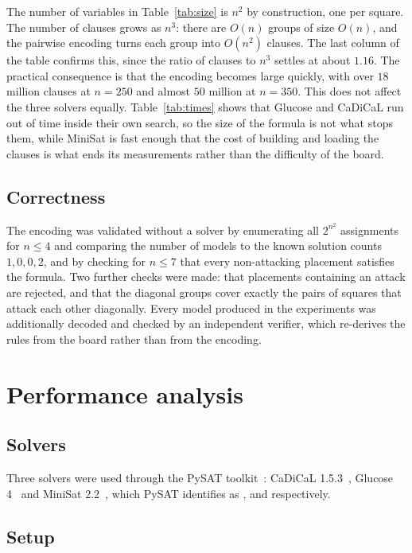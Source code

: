 \documentclass[11pt,a4paper]{article}
\begin{document}
The number of variables in Table~\ref{tab:size} is $n^2$ by construction,
one per square. The number of clauses grows as $n^3$: there are $O(n)$
groups of size $O(n)$, and the pairwise encoding turns each group into
$O(n^2)$ clauses. The last column of the table confirms this, since the
ratio of clauses to $n^3$ settles at about $1.16$.
The practical consequence is that the encoding becomes large quickly, with over
$18$ million clauses at $n=250$ and almost $50$ million at $n=350$. This does
not affect the three solvers equally. Table~\ref{tab:times} shows that
Glucose and CaDiCaL run out of time inside their own search, so the size of
the formula is not what stops them, while MiniSat is fast enough that the
cost of building and loading the clauses is what ends its measurements
rather than the difficulty of the board.

\subsection*{Correctness}

The encoding was validated without a solver by enumerating all $2^{n^2}$
assignments for $n \le 4$ and comparing the number of models to the known
solution counts $1, 0, 0, 2$, and by checking for $n \le 7$ that every
non-attacking placement satisfies the formula. Two further checks were made:
that placements containing an attack are rejected, and that the diagonal
groups cover exactly the pairs of squares that attack each other
diagonally. Every model produced in the experiments was additionally decoded
and checked by an independent verifier, which re-derives the rules from the
board rather than from the encoding.

\section{Performance analysis}

\subsection*{Solvers}

Three solvers were used through the PySAT toolkit~\cite{pysat}: CaDiCaL
1.5.3~\cite{cadical}, Glucose 4~\cite{glucose} and MiniSat
2.2~\cite{minisat}, which PySAT identifies as ,
 and  respectively.

\subsection*{Setup}
\end{document}
